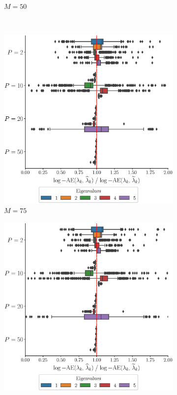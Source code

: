 \begin{results}
\begin{figure}
\begin{subfigure}[b]{0.49\textwidth}
         \caption{$M = 50$}
         \label{fig:logAE_mfd_1d_50}
     \end{subfigure}
     \\
     \begin{subfigure}[b]{0.49\textwidth}
         \centering
         \includegraphics[width=\textwidth]{figures/scenario_1/logAE_N50_M75.eps}
         \caption{$M = 75$}
         \label{fig:logAE_mfd_1d_75}
     \end{subfigure}
     \begin{subfigure}[b]{0.49\textwidth}
         \centering
         \includegraphics[width=\textwidth]{figures/scenario_1/logAE_N50_M100.eps}

\end{subfigure}
\end{figure}
\end{results}
